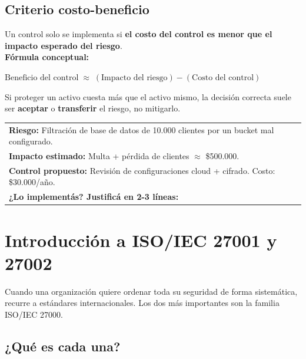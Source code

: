 \documentclass[12pt,a4paper]{article}
\renewcommand{\arraystretch}{1.25}
\begin{document}
\subsection{Criterio costo-beneficio}
\begin{cajaConcepto}[title={La pregunta de negocio}]
Un control solo se implementa si \textbf{el costo del control es menor que el impacto esperado del riesgo}.\\[4pt]
\textbf{F\'ormula conceptual:}
\begin{center}
$\text{Beneficio del control} \;\approx\; (\text{Impacto del riesgo}) - (\text{Costo del control})$
\end{center}
Si proteger un activo cuesta m\'as que el activo mismo, la decisi\'on correcta suele ser \textbf{aceptar} o \textbf{transferir} el riesgo, no mitigarlo.
\end{cajaConcepto}

\begin{cajaActividad}[title={Ejercicio r\'apido: justific\'a el costo-beneficio}]
\renewcommand{\arraystretch}{1.6}
\begin{tabularx}{\textwidth}{|X|}
\hline
\textbf{Riesgo:} Filtraci\'on de base de datos de 10.000 clientes por un bucket mal configurado. \\
\textbf{Impacto estimado:} Multa + p\'erdida de clientes $\approx$ \$500.000. \\
\textbf{Control propuesto:} Revisi\'on de configuraciones cloud + cifrado. Costo: \$30.000/a\~no. \\[4pt]
\textbf{¿Lo implement\'as? Justific\'a en 2-3 líneas:} \\[2.5cm]
\hline
\end{tabularx}
\end{cajaActividad}

\newpage
\section{Introducci\'on a ISO/IEC 27001 y 27002}

Cuando una organizaci\'on quiere ordenar toda su seguridad de forma sistem\'atica, recurre a est\'andares internacionales. Los dos m\'as importantes son la familia ISO/IEC 27000.

\subsection{¿Qu\'e es cada una?}
\end{document}
